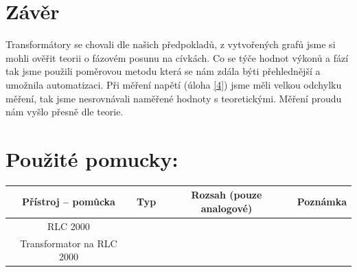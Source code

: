 \documentclass[a4paper]{article}
\begin{document}
\section*{Závěr}
Transformátory se chovali dle našich předpokladů, z vytvořených grafů jsme si mohli ověřit teorii o fázovém posunu na cívkách.
 Co se týče hodnot výkonů a fází tak jsme použili poměrovou metodu která se nám zdála býti přehlednější a umožnila automatizaci.
Při měření napětí (úloha \ref{4}) jsme měli velkou odchylku měření, tak jsme nesrovnávali naměřené hodnoty s teoretickými. Měření proudu nám vyšlo přesně dle teorie.
\section*{Použité pomucky:}
\begin{tabularx}{\linewidth}{c|c|c|l}
	Přístroj – pomůcka&Typ&Rozsah (pouze analogové)
	& Poznámka \\
	\hline
	RLC 2000&&&\\
	\hline
	Transformator na RLC 2000&&&\\
	\hline
\end{tabularx}
\end{document}
